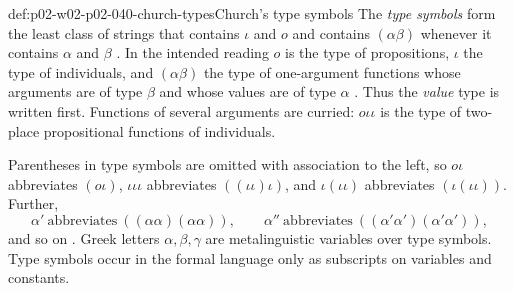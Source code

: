 \begin{hbdefinition}{def:p02-w02-p02-040-church-types}{Church's type symbols}
The \emph{type symbols} form the least class of strings that contains
\(\iota\) and \(o\) and contains \((\alpha\beta)\) whenever it contains
\(\alpha\) and \(\beta\) \cite[\S1, p.~56]{Church1940}.  In the intended
reading \(o\) is the type of propositions, \(\iota\) the type of
individuals, and \((\alpha\beta)\) the type of one-argument functions whose
arguments are of type \(\beta\) and whose values are of type \(\alpha\)
\cite[\S1, pp.~56--57]{Church1940}.  Thus the \emph{value} type is written
first.  Functions of several arguments are curried: \(o\iota\iota\) is the
type of two-place propositional functions of individuals.

Parentheses in type symbols are omitted with association to the left, so
\(o\iota\) abbreviates \((o\iota)\), \(\iota\iota\iota\) abbreviates
\(((\iota\iota)\iota)\), and \(\iota(\iota\iota)\) abbreviates
\((\iota(\iota\iota))\).  Further,
\[
 \alpha'\ \text{abbreviates}\ ((\alpha\alpha)(\alpha\alpha)),\qquad
 \alpha''\ \text{abbreviates}\ ((\alpha'\alpha')(\alpha'\alpha')),
\]
and so on \cite[\S1, p.~56]{Church1940}.  Greek letters
\(\alpha,\beta,\gamma\) are metalinguistic variables over type symbols.
Type symbols occur in the formal language only as subscripts on variables
and constants.
\end{hbdefinition}

